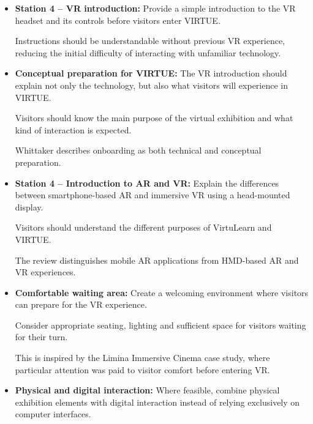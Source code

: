 \begin{itemize}
    This provides a connection between the
    physical exhibition and the digital archive.

    It is inspired by the use of supplementary
    digital content in museum learning.
    \cite[pp.~6,~9]{zhou_meta-analytic_2022}

    \item \textbf{Station 4 -- VR introduction:}
    Provide a simple introduction to the VR headset and its
    controls before visitors enter VIRTUE.

    Instructions should be understandable without previous VR
    experience, reducing the initial difficulty of interacting
    with unfamiliar technology.
    \cite[pp.~101--102]{whittaker_onboarding_2025}

    \item \textbf{Conceptual preparation for VIRTUE:}
    The VR introduction should explain not only the technology,
    but also what visitors will experience in VIRTUE.

    Visitors should know the main purpose of the virtual
    exhibition and what kind of interaction is expected.

    Whittaker describes onboarding as both technical and
    conceptual preparation.
    \cite[p.~88]{whittaker_onboarding_2025}
    \cite[pp.~95--96]{whittaker_onboarding_2025}

    \item \textbf{Station 4 -- Introduction to AR and VR:}
    Explain the differences between smartphone-based
    AR and immersive VR using a head-mounted display.

    Visitors should understand the different
    purposes of VirtuLearn and VIRTUE.

    The review distinguishes mobile AR applications
    from HMD-based AR and VR experiences.
    \cite[pp.~6,~9--10]{zhou_meta-analytic_2022}

    \item \textbf{Comfortable waiting area:}
    Create a welcoming environment where visitors can
    prepare for the VR experience.

    Consider appropriate seating, lighting and sufficient
    space for visitors waiting for their turn.

    This is inspired by the Limina Immersive Cinema
    case study, where particular attention was paid to
    visitor comfort before entering VR.
    \cite[p.~90]{whittaker_onboarding_2025}

    \item \textbf{Physical and digital interaction:}
    Where feasible, combine physical exhibition elements with
    digital interaction instead of relying exclusively on
    computer interfaces.


\end{itemize}

